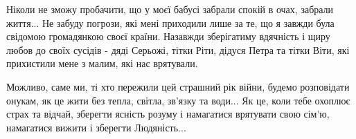 Ніколи не зможу пробачити, що у моєї бабусі  забрали спокій в очах, забрали
життя... Не забуду погрози, які мені приходили лише за те, що я завжди була
свідомою громадянкою своєї країни. Назавжди зберігатиму вдячність і щиру любов
до своїх сусідів - дяді Серьожі, тітки Ріти, дідуся Петра та тітки Віти, які
прихистили мене з малим, які нас врятували.

Можливо, саме ми, ті хто пережили цей страшний рік війни,  будемо розповідати
онукам, як це жити без тепла, світла, зв'язку та води... Як це, коли тебе
охоплює страх та відчай, зберегти ясність розуму і намагатися врятувати свою
сім'ю,  намагатися вижити і зберегти Людяність...

